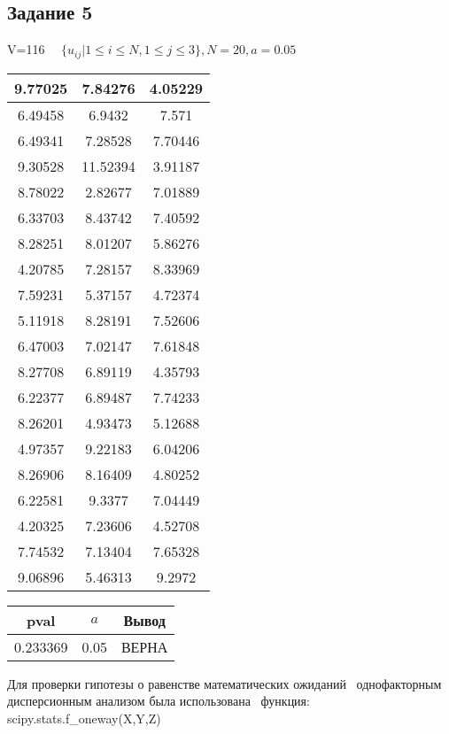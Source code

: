 \subsection{Задание 5}%
\label{subsec:5}%
%
V=116%
$\quad \{ u_{ij}|1 \le i \le N, 1\le j \le 3 \}, N=20, a =0.05 $

%
\begin{changemargin}{0cm}{0cm}\small{%
\center%
\begin{tabular}{|c|c|c|}%
\hline%
9.77025&7.84276&4.05229\\%
\hline%
6.49458&6.9432&7.571\\%
\hline%
6.49341&7.28528&7.70446\\%
\hline%
9.30528&11.52394&3.91187\\%
\hline%
8.78022&2.82677&7.01889\\%
\hline%
6.33703&8.43742&7.40592\\%
\hline%
8.28251&8.01207&5.86276\\%
\hline%
4.20785&7.28157&8.33969\\%
\hline%
7.59231&5.37157&4.72374\\%
\hline%
5.11918&8.28191&7.52606\\%
\hline%
6.47003&7.02147&7.61848\\%
\hline%
8.27708&6.89119&4.35793\\%
\hline%
6.22377&6.89487&7.74233\\%
\hline%
8.26201&4.93473&5.12688\\%
\hline%
4.97357&9.22183&6.04206\\%
\hline%
8.26906&8.16409&4.80252\\%
\hline%
6.22581&9.3377&7.04449\\%
\hline%
4.20325&7.23606&4.52708\\%
\hline%
7.74532&7.13404&7.65328\\%
\hline%
9.06896&5.46313&9.2972\\%
\hline%
\end{tabular}%
\newline%
\newline%
%
}\end{changemargin}%
\begin{changemargin}{-0cm}{0cm}\small{%
\center%
\begin{tabular}{|c|c|c|}%
\hline%
pval&$a$&Вывод\\%
\hline%
0.233369&0.05&ВЕРНА\\%
\hline%
\end{tabular}%
\newline%
\newline%
%
}\end{changemargin}%
Для проверки гипотезы о равенстве математических ожиданий \
            однофакторным дисперсионным анализом была использована \
            функция: scipy.stats.f\_oneway(X,Y,Z)